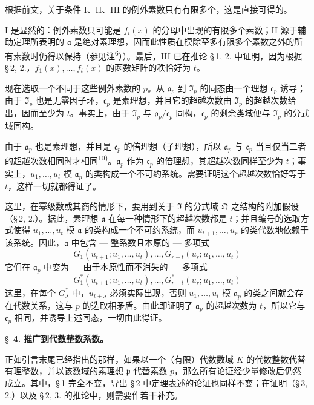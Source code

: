 \documentclass[11pt]{article}
\begin{document}
根据前文，关于条件 I、II、III 的例外素数只有有限多个，这是直接可得的。

I 是显然的：例外素数只可能是 $f_i(x)$ 的分母中出现的有限多个素数；II 源于辅助定理所表明的 $\mathfrak{a}$ 是绝对素理想，因而此性质在模除至多有限多个素数之外的所有素数时仍得以保持（参见注\textsuperscript{6}））。最后，III 已在推论 \S\,1, 2. 中证明，因为根据 \S\,2, 2.，$f_1(x),\ldots,f_t(x)$ 的函数矩阵的秩恰好为 $t$。

现在选取一个不同于这些例外素数的 $p$。从 $\mathfrak{o}_p$ 到 $\mathfrak{I}_p$ 的同态由一个理想 $\mathfrak{c}_p$ 诱导；由于 $\mathfrak{I}_p$ 也是无零因子环，$\mathfrak{c}_p$ 是素理想，并且它的超越次数由 $\mathfrak{I}_p$ 的超越次数给出，因而至少为 $t$。事实上，由于 $\mathfrak{I}_p$ 与 $\mathfrak{o}_p/\mathfrak{c}_p$ 同构，$\mathfrak{c}_p$ 的剩余类域便与 $\mathfrak{I}_p$ 的分式域同构。

由于 $\mathfrak{a}_p$ 也是素理想，并且是 $\mathfrak{c}_p$ 的倍理想（子理想），所以 $\mathfrak{a}_p$ 与 $\mathfrak{c}_p$ 当且仅当二者的超越次数相同时才相同\textsuperscript{10)}。$\mathfrak{a}_p$ 作为 $\mathfrak{c}_p$ 的倍理想，其超越次数同样至少为 $t$；事实上，$u_1,\ldots,u_t$ 模 $\mathfrak{a}_p$ 的类构成一个不可约系统。需要证明这个超越次数恰好等于 $t$，这样一切就都得证了。

这里，在幂级数或其商的情形下，要用到关于 $\mathfrak{I}$ 的分式域 $\mathfrak{Q}$ 之结构的附加假设（\S\,2, 2.）。据此，素理想 $\mathfrak{a}$ 在每一种情形下的超越次数都是 $t$；并且编号的选取方式使得 $u_1,\ldots,u_t$ 模 $\mathfrak{a}$ 的类构成一个不可约系统，而 $u_{t+1},\ldots,u_r$ 的类代数地依赖于该系统。因此，$\mathfrak{a}$ 中包含 --- 整系数且本原的 --- 多项式
\[
G_1(u_{t+1};u_1,\ldots,u_t),\ldots,G_{r-t}(u_r;u_1,\ldots,u_t)\tag{1}
\]
它们在 $\mathfrak{a}_p$ 中变为 --- 由于本原性而不消失的 --- 多项式
\[
G^*_1(u_{t+1};u_1,\ldots,u_t),\ldots,G^*_{r-t}(u_r;u_1,\ldots,u_t)\tag{2}
\]
这里，在每个 $G^*_\lambda$ 中，$u_{t+\lambda}$ 必须实际出现，否则 $u_1,\ldots,u_t$ 模 $\mathfrak{a}_p$ 的类之间就会存在代数关系，这与 $p$ 的选取相矛盾。由此即证明了 $\mathfrak{a}_p$ 的超越次数为 $t$，所以它与 $\mathfrak{c}_p$ 相同，并诱导上述同态，一切由此得证。

\bigskip
\S~\textbf{4.}
\textbf{推广到代数整数系数。}

\smallskip

\noindent
正如引言末尾已经指出的那样，如果以一个（有限）代数数域 $K$ 的代数整数代替有理整数，并以该数域的素理想 $\mathfrak{p}$ 代替素数 $p$，那么所有论证经少量修改后仍然成立。其中，\S\,1 完全不变，导出 \S\,2 中定理表述的论证也同样不变；在证明（\S\,3, 2.）以及 \S\,2, 3. 的推论中，则需要作若干补充。
\end{document}
